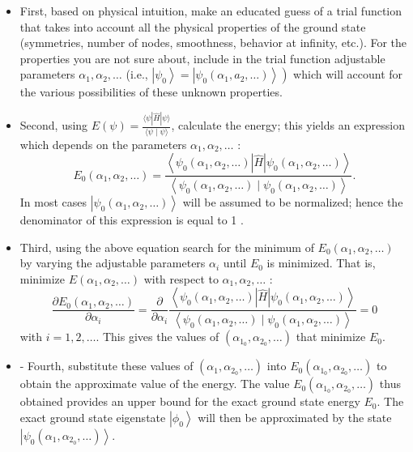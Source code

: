\begin{itemize}
	\item First, based on physical intuition, make an educated guess of a trial function that takes into account all the physical properties of the ground state (symmetries, number of nodes, smoothness, behavior at infinity, etc.). For the properties you are not sure about, include in the trial function adjustable parameters $\alpha_{1}, \alpha_{2}, \ldots$ (i.e., $\left.\left|\psi_{0}\right\rangle=\left|\psi_{0}\left(\alpha_{1}, a_{2}, \ldots\right)\right\rangle\right)$ which will account for the various possibilities of these unknown properties.
	\item Second, using $E(\psi)=\frac{\langle\psi|\hat{H}| \psi\rangle}{\langle\psi \mid \psi\rangle}$, calculate the energy; this yields an expression which depends on the parameters $\alpha_{1}, \alpha_{2}, \ldots$ :
	$$
	E_{0}\left(\alpha_{1}, \alpha_{2}, \ldots\right)=\frac{\left\langle\psi_{0}\left(\alpha_{1}, \alpha_{2}, \ldots\right)|\hat{H}| \psi_{0}\left(\alpha_{1}, \alpha_{2}, \ldots\right)\right\rangle}{\left\langle\psi_{0}\left(\alpha_{1}, \alpha_{2}, \ldots\right) \mid \psi_{0}\left(\alpha_{1}, \alpha_{2}, \ldots\right)\right\rangle} .
	$$
	In most cases $\left|\psi_{0}\left(\alpha_{1}, \alpha_{2}, \ldots\right)\right\rangle$ will be assumed to be normalized; hence the denominator of this expression is equal to 1 .
	\item Third, using the above equation search for the minimum of $E_{0}\left(\alpha_{1}, \alpha_{2}, \ldots\right)$ by varying the adjustable parameters $\alpha_{i}$ until $E_{0}$ is minimized. That is, minimize $E\left(\alpha_{1}, \alpha_{2}, \ldots\right)$ with respect to $\alpha_{1}, \alpha_{2}, \ldots$ :
	$$
	\frac{\partial E_{0}\left(\alpha_{1}, \alpha_{2}, \ldots\right)}{\partial \alpha_{i}}=\frac{\partial}{\partial \alpha_{i}} \frac{\left\langle\psi_{0}\left(\alpha_{1}, \alpha_{2}, \ldots\right)|\hat{H}| \psi_{0}\left(\alpha_{1}, \alpha_{2}, \ldots\right)\right\rangle}{\left\langle\psi_{0}\left(\alpha_{1}, \alpha_{2}, \ldots\right) \mid \psi_{0}\left(\alpha_{1}, \alpha_{2}, \ldots\right)\right\rangle}=0
	$$
	with $i=1,2, \ldots$. This gives the values of $\left(\alpha_{1_{0}}, \alpha_{2_{0}}, \ldots\right)$ that minimize $E_{0}$.
	\item - Fourth, substitute these values of $\left(\alpha_{1}, \alpha_{2_{0}}, \ldots\right)$ into $E_{0}\left(\alpha_{1_{0}}, \alpha_{2_{0}}, \ldots\right)$ to obtain the approximate value of the energy. The value $E_{0}\left(\alpha_{1_{0}}, \alpha_{2_{0}}, \ldots\right)$ thus obtained provides an upper bound for the exact ground state energy $E_{0}$. The exact ground state eigenstate $\left|\phi_{0}\right\rangle$ will then be approximated by the state $\left|\psi_{0}\left(\alpha_{1}, \alpha_{2_{0}}, \ldots\right)\right\rangle$.
\end{itemize}

